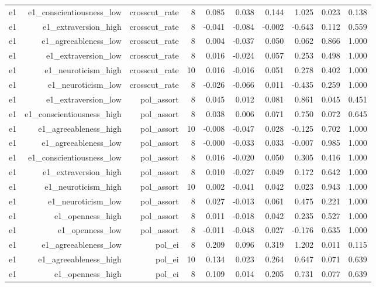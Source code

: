 \documentclass[11pt]{article}
\begin{document}
\begin{landscape}
\begin{longtable}{@{}lrrrrrrrrr@{}}
e1 & e1\_conscientiousness\_low & crosscut\_rate & 8 & 0.085 & 0.038 & 0.144 & 1.025 & 0.023 & 0.138 \\
e1 & e1\_extraversion\_high & crosscut\_rate & 8 & -0.041 & -0.084 & -0.002 & -0.643 & 0.112 & 0.559 \\
e1 & e1\_agreeableness\_low & crosscut\_rate & 8 & 0.004 & -0.037 & 0.050 & 0.062 & 0.866 & 1.000 \\
e1 & e1\_extraversion\_low & crosscut\_rate & 8 & 0.016 & -0.024 & 0.057 & 0.253 & 0.498 & 1.000 \\
e1 & e1\_neuroticism\_high & crosscut\_rate & 10 & 0.016 & -0.016 & 0.051 & 0.278 & 0.402 & 1.000 \\
e1 & e1\_neuroticism\_low & crosscut\_rate & 8 & -0.026 & -0.066 & 0.011 & -0.435 & 0.259 & 1.000 \\
e1 & e1\_extraversion\_low & pol\_assort & 8 & 0.045 & 0.012 & 0.081 & 0.861 & 0.045 & 0.451 \\
e1 & e1\_conscientiousness\_high & pol\_assort & 8 & 0.038 & 0.006 & 0.071 & 0.750 & 0.072 & 0.645 \\
e1 & e1\_agreeableness\_high & pol\_assort & 10 & -0.008 & -0.047 & 0.028 & -0.125 & 0.702 & 1.000 \\
e1 & e1\_agreeableness\_low & pol\_assort & 8 & -0.000 & -0.033 & 0.033 & -0.007 & 0.985 & 1.000 \\
e1 & e1\_conscientiousness\_low & pol\_assort & 8 & 0.016 & -0.020 & 0.050 & 0.305 & 0.416 & 1.000 \\
e1 & e1\_extraversion\_high & pol\_assort & 8 & 0.010 & -0.027 & 0.049 & 0.172 & 0.642 & 1.000 \\
e1 & e1\_neuroticism\_high & pol\_assort & 10 & 0.002 & -0.041 & 0.042 & 0.023 & 0.943 & 1.000 \\
e1 & e1\_neuroticism\_low & pol\_assort & 8 & 0.027 & -0.013 & 0.061 & 0.475 & 0.221 & 1.000 \\
e1 & e1\_openness\_high & pol\_assort & 8 & 0.011 & -0.018 & 0.042 & 0.235 & 0.527 & 1.000 \\
e1 & e1\_openness\_low & pol\_assort & 8 & -0.011 & -0.048 & 0.027 & -0.176 & 0.635 & 1.000 \\
e1 & e1\_agreeableness\_low & pol\_ei & 8 & 0.209 & 0.096 & 0.319 & 1.202 & 0.011 & 0.115 \\
e1 & e1\_agreeableness\_high & pol\_ei & 10 & 0.134 & 0.023 & 0.264 & 0.647 & 0.071 & 0.639 \\
e1 & e1\_openness\_high & pol\_ei & 8 & 0.109 & 0.014 & 0.205 & 0.731 & 0.077 & 0.639 \\

\end{longtable}
\end{landscape}
\end{document}

